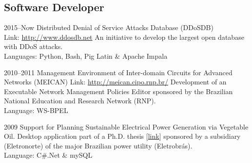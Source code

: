\documentclass[]{friggeri-cv} %
\begin{document}




\newpage
\subsection{Software Developer}
\begin{entrylist}

\entry
{2015--Now}
{Distributed Denial of Service Attacks Database (DDoSDB)}
{\\Link: \href{http://ddosdb.net}{http://www.ddosdb.net} }
{An initiative to develop the largest open database with DDoS attacks.\\
Languages: Python, Bash, Pig Latin \& Apache Impala
}

\entry
{2010--2011}
{{Management Environment of Inter-domain Circuits for Advanced Networks (MEICAN)}}
{Link: \href{http://meican.cipo.rnp.br/}{http://meican.cipo.rnp.br/}}
{Development of an Executable Network Management Policies Editor sponsored by the Brazilian National Education and Research Network (RNP).    \\
Language: WS-BPEL
}

\entry
{2009}
{Support for Planning Sustainable Electrical Power Generation via Vegetable Oil.}
{}
{Desktop application part of a Ph.D. thesis [\href{https://sites.google.com/site/ceamazonufpa/TeseAnaRosaDuarte.pdf}{link}] sponsored by a subsidiary (Eletronorte) of the major Brazilian power utility (Eletrobrás).\\
Language: C\#.Net \& mySQL
}
\end{entrylist}
\end{document}
